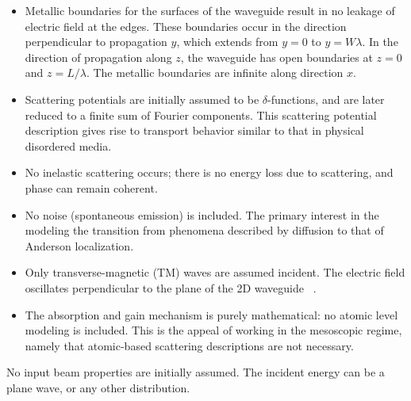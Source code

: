 \begin{itemize}
\item Metallic boundaries for the surfaces of the waveguide result in no leakage of electric field at the edges. These boundaries occur in the direction perpendicular to propagation $y$, which extends from $y=0$ to $y=W\lambda$. In the direction of propagation along $z$, the waveguide has open boundaries at $z=0$ and $z=L/\lambda$. The metallic boundaries are infinite along direction $x$.
\item Scattering potentials are initially assumed to be $\delta$-functions, and are later reduced to a finite sum of Fourier components. This scattering potential description gives rise to transport behavior similar to that in physical disordered media. 
\item No inelastic scattering occurs; there is no energy loss due to scattering, and phase can remain coherent.%
\item No noise (spontaneous emission) is included. The primary interest in the modeling the transition from phenomena described by diffusion to that of Anderson localization. %
\item Only transverse-magnetic (TM) waves are assumed incident. The electric field oscillates perpendicular to the plane of the 2D waveguide~
\cite{1996_soukoulis_dis2d}.
\item The absorption and gain mechanism is purely mathematical: no atomic level modeling is included. This is the appeal of working in the mesoscopic regime, namely that atomic-based scattering descriptions are not necessary.
\end{itemize}
No input beam properties are initially assumed. The incident energy can be a plane wave, or any other distribution.

